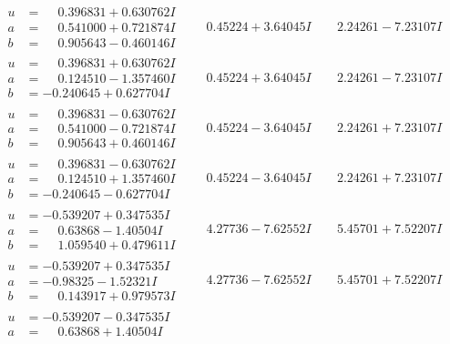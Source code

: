 \documentclass[1p]{elsarticle_modified}
\theoremstyle{definition}
\begin{document}
$$\begin{array}{c|c|c}
\begin{aligned}
u &= \phantom{-}0.396831 + 0.630762 I \\
a &= \phantom{-}0.541000 + 0.721874 I \\
b &= \phantom{-}0.905643 - 0.460146 I\end{aligned}
 & \phantom{-}0.45224 + 3.64045 I & \phantom{-}2.24261 - 7.23107 I \\ \hline\begin{aligned}
u &= \phantom{-}0.396831 + 0.630762 I \\
a &= \phantom{-}0.124510 - 1.357460 I \\
b &= -0.240645 + 0.627704 I\end{aligned}
 & \phantom{-}0.45224 + 3.64045 I & \phantom{-}2.24261 - 7.23107 I \\ \hline\begin{aligned}
u &= \phantom{-}0.396831 - 0.630762 I \\
a &= \phantom{-}0.541000 - 0.721874 I \\
b &= \phantom{-}0.905643 + 0.460146 I\end{aligned}
 & \phantom{-}0.45224 - 3.64045 I & \phantom{-}2.24261 + 7.23107 I \\ \hline\begin{aligned}
u &= \phantom{-}0.396831 - 0.630762 I \\
a &= \phantom{-}0.124510 + 1.357460 I \\
b &= -0.240645 - 0.627704 I\end{aligned}
 & \phantom{-}0.45224 - 3.64045 I & \phantom{-}2.24261 + 7.23107 I \\ \hline\begin{aligned}
u &= -0.539207 + 0.347535 I \\
a &= \phantom{-}0.63868 - 1.40504 I \\
b &= \phantom{-}1.059540 + 0.479611 I\end{aligned}
 & \phantom{-}4.27736 - 7.62552 I & \phantom{-}5.45701 + 7.52207 I \\ \hline\begin{aligned}
u &= -0.539207 + 0.347535 I \\
a &= -0.98325 - 1.52321 I \\
b &= \phantom{-}0.143917 + 0.979573 I\end{aligned}
 & \phantom{-}4.27736 - 7.62552 I & \phantom{-}5.45701 + 7.52207 I \\ \hline\begin{aligned}
u &= -0.539207 - 0.347535 I \\
a &= \phantom{-}0.63868 + 1.40504 I \\

\end{aligned}
\end{array}$$
\end{document}
